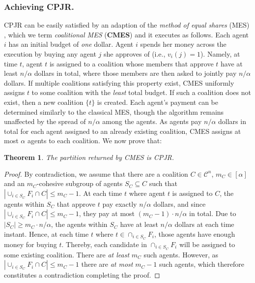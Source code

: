 \documentclass[letterpaper]{article}
\newtheorem{theorem}{Theorem}
\begin{document}
\subsubsection{Achieving CPJR.}
\label{sec:Proportional Justified Representation (PJR)}
CPJR can be easily satisfied by an adaption of the \textit{method of equal shares} (MES) \cite{peters2021proportional,peters2020proportionality}, which we term \textit{coalitional MES} (\textbf{CMES}) and it executes as follows. Each agent $i$ has an initial budget of \textit{one} dollar. Agent $i$ spends her money across the execution by buying any agent $j$ she approves of (i.e., $v_i(j) = 1$). Namely, at time $t$, agent $t$ is assigned to a coalition whose members that approve $t$ have at least $n/\alpha$ dollars in total, where those members are then asked to jointly pay $n/\alpha$ dollars. If multiple coalitions satisfying this property exist, CMES uniformly assigns $t$ to some coalition with the \textit{least} total budget. If such a coalition does not exist, then a new coalition $\{t\}$ is created. Each agent's payment can be determined similarly to the classical MES, though the algorithm remains unaffected by the spread of $n/\alpha$ among the agents. As agents pay $n/\alpha$ dollars in total for each agent assigned to an already existing coalition, CMES assigns at most $\alpha$ agents to each coalition. We now prove that:
\begin{theorem}
\label{thm:cmes}
The partition returned by CMES is CPJR.
\end{theorem}
\begin{proof}
By contradiction, we assume that there are a coalition $C \in \mathcal{C}^n$, $m_C \in [\alpha]$ and an $m_C$-cohesive subgroup of agents $S_C \subseteq C$ such that $|\cup_{i \in S_C} F_i \cap C| \leq m_C-1$. At each time $t$ where agent $t$ is assigned to $C$, the agents within $S_C$ that approve $t$ pay exactly $n/\alpha$ dollars, and since $|\cup_{i \in S_C} F_i \cap C| \leq m_C-1$, they pay at most $(m_C-1) \cdot n/\alpha$ in total. Due to $|S_C| \geq m_C \cdot n/\alpha$, the agents within $S_C$ have at least $n/\alpha$ dollars at each time instant. Hence, at each time $t$ where $t \in \cap_{i \in S_C} F_i$, those agents have enough money for buying $t$. Thereby, each candidate in $\cap_{i \in S_C} F_i$ will be assigned to some existing coalition. There are \textit{at least} $m_C$ such agents. However, as $|\cup_{i \in S_C} F_i \cap C| \leq m_C-1$ there are \textit{at most} $m_C - 1$ such agents, which therefore constitutes a contradiction completing the proof.
\end{proof}
\end{document}
